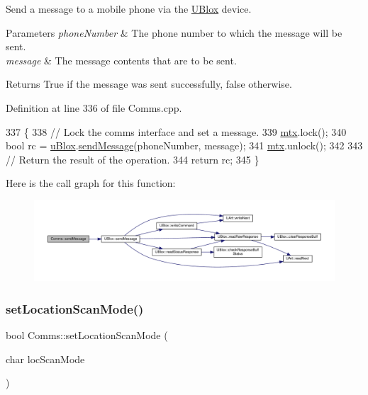 Send a message to a mobile phone via the \hyperlink{class_u_blox}{U\+Blox} device.


\begin{DoxyParams}{Parameters}
{\em phone\+Number} & The phone number to which the message will be sent. \\
\hline
{\em message} & The message contents that are to be sent. \\
\hline
\end{DoxyParams}
\begin{DoxyReturn}{Returns}
True if the message was sent successfully, false otherwise. 
\end{DoxyReturn}


Definition at line 336 of file Comms.\+cpp.


\begin{DoxyCode}
337 \{
338     \textcolor{comment}{// Lock the comms interface and set a message.}
339     \hyperlink{class_comms_a21df861b1202573e4cd0cb5666d638fe}{mtx}.lock();
340     \textcolor{keywordtype}{bool} rc = \hyperlink{class_comms_ac64dea134b116147e5441172346dbd6c}{uBlox}.\hyperlink{class_u_blox_a946f2903bb01a62cd5bdef423eaa9750}{sendMessage}(phoneNumber, message);
341     \hyperlink{class_comms_a21df861b1202573e4cd0cb5666d638fe}{mtx}.unlock();
342 
343     \textcolor{comment}{// Return the result of the operation.}
344     \textcolor{keywordflow}{return} rc;
345 \}
\end{DoxyCode}
Here is the call graph for this function\+:
\nopagebreak
\begin{figure}[H]
\begin{center}
\leavevmode
\includegraphics[width=350pt]{d8/dcc/class_comms_ad28b072a0852ac95aa2475324cbfae60_cgraph}
\end{center}
\end{figure}
\mbox{\label{class_comms_a73c0cd58db7daf118bd0b1726fc9dded}} 
\subsubsection{\texorpdfstring{set\+Location\+Scan\+Mode()}{setLocationScanMode()}}
{\footnotesize\ttfamily bool Comms\+::set\+Location\+Scan\+Mode (\begin{DoxyParamCaption}\item[{char}]{loc\+Scan\+Mode }\end{DoxyParamCaption})}

